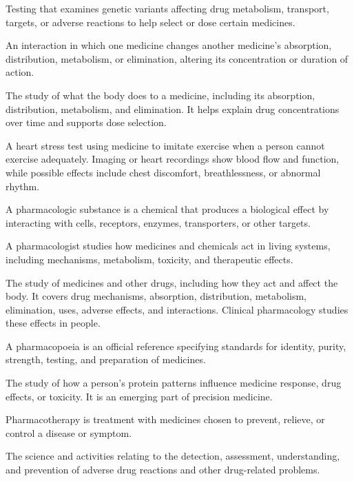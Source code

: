  Testing that examines genetic variants affecting drug metabolism, transport, targets, or adverse reactions to help select or dose certain medicines.

 An interaction in which one medicine changes another medicine’s absorption, distribution, metabolism, or elimination, altering its concentration or duration of action.

 The study of what the body does to a medicine, including its absorption, distribution, metabolism, and elimination. It helps explain drug concentrations over time and supports dose selection.

 A heart stress test using medicine to imitate exercise when a person cannot exercise adequately. Imaging or heart recordings show blood flow and function, while possible effects include chest discomfort, breathlessness, or abnormal rhythm.

 A pharmacologic substance is a chemical that produces a biological effect by interacting with cells, receptors, enzymes, transporters, or other targets.

 A pharmacologist studies how medicines and chemicals act in living systems, including mechanisms, metabolism, toxicity, and therapeutic effects.

 The study of medicines and other drugs, including how they act and affect the body. It covers drug mechanisms, absorption, distribution, metabolism, elimination, uses, adverse effects, and interactions. Clinical pharmacology studies these effects in people.

 A pharmacopoeia is an official reference specifying standards for identity, purity, strength, testing, and preparation of medicines.

 The study of how a person's protein patterns influence medicine response, drug effects, or toxicity. It is an emerging part of precision medicine.

 Pharmacotherapy is treatment with medicines chosen to prevent, relieve, or control a disease or symptom.

 The science and activities relating to the detection, assessment, understanding, and
prevention of adverse drug reactions and other drug-related problems.

